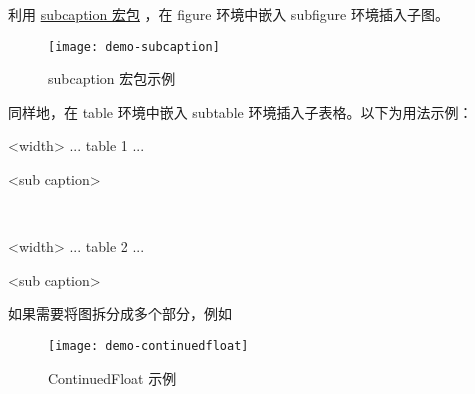 利用 \href{http://www.ctan.org/pkg/subcaption}{subcaption 宏包} \cite{subcaption}，在 figure 环境中嵌入 subfigure 环境插入子图。
\begin{figure}[]
  \centering
  \texttt{[image: demo-subcaption]}
  \caption{subcaption 宏包示例}
  \label{demo-subcaption}
\end{figure}
同样地，在 table 环境中嵌入 subtable 环境插入子表格。以下为用法示例：
\begin{texlst}
\begin{table}[<placement specifier>]
  \begin{subtable}{<width>}
      \centering
      ... table 1 ...
  \caption{<sub caption>}
  \end{subtable}
  ~
  \begin{subtable}{<width>}
      \centering
      ... table 2 ...
      \caption{<sub caption>}
  \end{subtable}
\end{table}
\end{texlst}

如果需要将图拆分成多个部分，例如
\begin{figure}[]
  \centering
  \texttt{[image: demo-continuedfloat]}
  \caption{ContinuedFloat 示例}
  \label{demo-continuedfloat}
\end{figure}